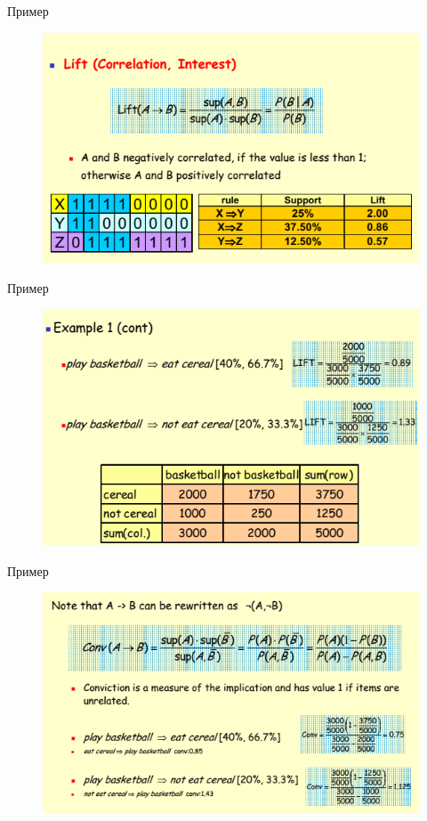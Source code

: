 \documentclass{beamer}
\begin{document}
\begin{frame}{Пример}
\begin{figure}[h]
\centering
\includegraphics[scale=0.6]{images/lec08-pic22.png}
\end{figure}
\end{frame}

\begin{frame}{Пример}
\begin{figure}[h]
\centering
\includegraphics[scale=0.6]{images/lec08-pic23.png}
\end{figure}
\end{frame}

\begin{frame}{Пример}
\begin{figure}[h]
\centering
\includegraphics[scale=0.6]{images/lec08-pic24.png}
\end{figure}
\end{frame}
\end{document}
